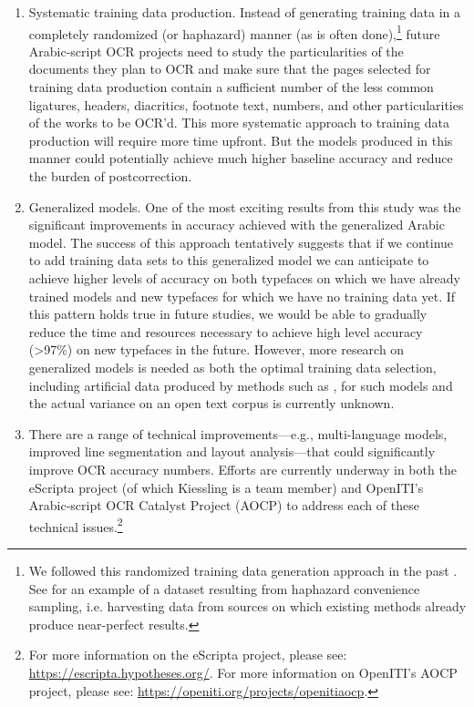 \begin{enumerate}
\item Systematic training data production. Instead of generating training data
in a completely randomized (or haphazard) manner (as is often
done),\footnote{We followed this randomized training data generation approach
in the past \cite{kiessling2017important}. See \cite{springmann2018ground} for
an example of a dataset resulting from haphazard convenience sampling, i.e.
harvesting data from sources on which existing methods already produce
near-perfect results.} future Arabic-script OCR projects need to study the
particularities of the documents they plan to OCR and make sure that the pages
selected for training data production contain a sufficient number of the less
common ligatures, headers, diacritics, footnote text, numbers, and other
particularities of the works to be OCR’d. This more systematic approach to
training data production will require more time upfront. But the models
produced in this manner could potentially achieve much higher baseline accuracy
and reduce the burden of postcorrection. 
\item Generalized models. One of the most exciting results from this study was
the significant improvements in accuracy achieved with the generalized Arabic
model. The success of this approach tentatively suggests that if we continue to
add training data sets to this generalized model we can anticipate to achieve
higher levels of accuracy on both typefaces on which we have already trained
models and new typefaces for which we have no training data yet. If this
pattern holds true in future studies, we would be able to gradually reduce the
time and resources necessary to achieve high level accuracy (>97\%) on new
typefaces in the future. However, more research on generalized models is needed
as both the optimal training data selection, including artificial data produced
by methods such as \cite{milo2019new}, for such models and the actual
variance on an open text corpus is currently unknown.
\item There are a range of technical improvements—e.g., multi-language models,
improved line segmentation and layout analysis—that could significantly improve
OCR accuracy numbers. Efforts are currently underway in both the eScripta
project (of which Kiessling is a team member) and OpenITI’s Arabic-script OCR
Catalyst Project (AOCP) to address each of these technical issues.\footnote{For
more information on the eScripta project, please see:
\url{https://escripta.hypotheses.org/}. For more information on OpenITI’s AOCP
project, please see: \url{https://openiti.org/projects/openitiaocp}.}
\end{enumerate}

